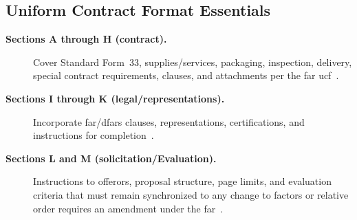 \documentclass[../main.tex]{subfiles}
\begin{document}
\subsection{Uniform Contract Format Essentials}
\begin{description}
  \item[\textbf{Sections A through H (contract).}] Cover Standard Form~33, supplies/services, packaging, inspection, delivery, special contract requirements, clauses, and attachments per the \ac{far} \ac{ucf}~\autocite{FAR}.
  \item[\textbf{Sections I through K (legal/representations).}] Incorporate \ac{far}/\ac{dfars} clauses, representations, certifications, and instructions for completion~\autocite{FAR,DFARS}.
  \item[\textbf{Sections L and M (solicitation/Evaluation).}] Instructions to offerors, proposal structure, page limits, and evaluation criteria that must remain synchronized to any change to factors or relative order requires an amendment under the \ac{far}~\autocite{FAR,NAVSEA-Source-Selection-Guide-2022}.
\end{description}

\end{document}
